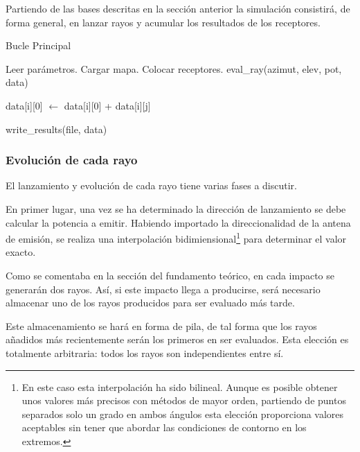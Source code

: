 Partiendo de las bases descritas en la sección anterior la simulación consistirá, de forma general, en lanzar rayos y acumular los resultados de los receptores.

\begin{algorithm}
    \caption{Bucle Principal}
    \label{euclid}
    \begin{algorithmic}[1]
        \State Leer parámetros.
        \State Cargar mapa.
        \State Colocar receptores.
        \For{azimut $\in [0, 360)$}
                \State eval\_ray(azimut, elev, pot, data)
            \EndFor
        \EndFor

                \State data[i][0] $\gets$ data[i][0] + data[i][j]
            \EndFor
        \EndFor

        \State write\_results(file, data)
    \end{algorithmic}
\end{algorithm}

\subsubsection*{Evolución de cada rayo}

El lanzamiento y evolución de cada rayo tiene varias fases a discutir.

En primer lugar, una vez se ha determinado la dirección de lanzamiento se debe calcular la potencia a emitir.
Habiendo importado la direccionalidad de la antena de emisión, se realiza una interpolación bidimiensional\footnote{En este caso esta interpolación ha sido bilineal. Aunque es posible obtener unos valores más precisos con métodos de mayor orden, partiendo de puntos separados solo un grado en ambos ángulos esta elección proporciona valores aceptables sin tener que abordar las condiciones de contorno en los extremos.} para determinar el valor exacto.

Como se comentaba en la sección del fundamento teórico, en cada impacto se generarán dos rayos.
Así, si este impacto llega a producirse, será necesario almacenar uno de los rayos producidos para ser evaluado más tarde.

Este almacenamiento se hará en forma de pila, de tal forma que los rayos añadidos más recientemente serán los primeros en ser evaluados.
Esta elección es totalmente arbitraria: todos los rayos son independientes entre sí.

